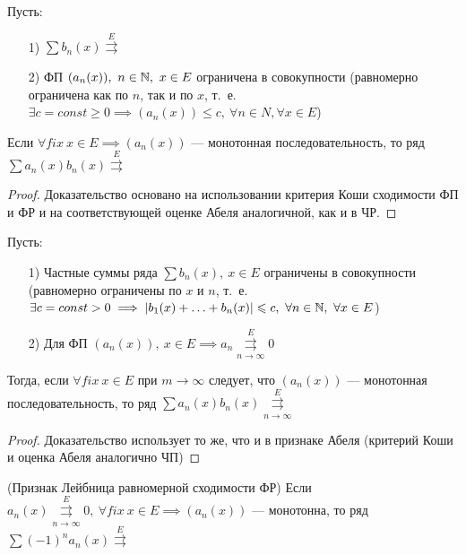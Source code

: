\documentclass[../../main.tex]{subfiles}
\begin{document}
\begin{thm}
Пусть:
\begin{itemize}
	\item[1)] $\sum b_n(x) \overset{E}{\rightrightarrows}$
	\item[2)] ФП $(a_n(x)),\ n \in \mathbb{N},\ x \in E$ ограничена 
в совокупности (равномерно ограничена как по $n$, так и по $x$, т.~е.
$\exists c = const \geq 0 \implies (a_n(x)) \leq c,\ 
\forall n \in N, \forall x \in E$)
\end{itemize}
Если $\forall fix \ x \in E \implies (a_n(x))$ --- монотонная 
последовательность, то ряд $\sum a_n(x)b_n(x) \overset{E}{\rightrightarrows}$
\end{thm}	

\begin{proof}
Доказательство основано на использовании критерия Коши сходимости ФП и ФР и
на соответствующей оценке Абеля аналогичной, как и в ЧР.	
\end{proof}

\begin{thm}
Пусть:
\begin{itemize}
	\item[1)] Частные суммы ряда $\sum b_n(x),\ x \in E$ 
ограничены в совокупности (равномерно ограничены по $x$ и $n$, 
т.~е. $\exists c = const > 0 \implies |b_1(x) + \ldots + b_n(x)| \leqslant c,\
\forall n \in \mathbb{N},\ \forall x \in E$)
	\item[2)] Для ФП $(a_n(x)),\ x \in E \implies a_n 
\overset{E}
{\underset{n \to \infty}\rightrightarrows} 0$
\end{itemize}
Тогда, если $\forall fix \ x \in E$ при $m \to \infty$ следует, 
что $(a_n(x))$ --- монотонная последовательность, 
то ряд $\sum a_n(x)b_n(x) \overset{E}
{\underset{n \to \infty}\rightrightarrows}$
\end{thm}

\begin{proof}
Доказательство использует то же, что и в признаке Абеля (критерий Коши и 
оценка Абеля аналогично ЧП)
\end{proof}

\begin{crl*} (Признак Лейбница равномерной сходимости ФР)
Если $a_n(x) \overset{E}
{\underset{n \to \infty}\rightrightarrows} 0,\ \forall fix \ x \in E \implies
(a_n(x))$ --- монотонна, то ряд $\sum (-1)^n a_n(x) \overset{E}
{\rightrightarrows}$ 	
\end{crl*}
\end{document}
